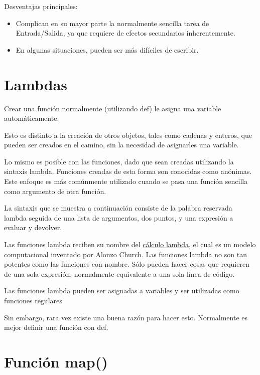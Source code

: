 \documentclass{report}
\begin{document}
Desventajas principales:

\begin{itemize}
  \item Complican en su mayor parte la normalmente sencilla tarea de Entrada/Salida, ya que requiere de efectos secundarios inherentemente.
  
  \item En algunas situaciones, pueden ser más difíciles de escribir.
\end{itemize}

\section{Lambdas}

Crear una función normalmente (utilizando def) le asigna una variable automáticamente.

Esto es distinto a la creación de otros objetos, tales como cadenas y enteros, que pueden ser creados en el camino, sin la necesidad de asignarles una variable.

Lo mismo es posible con las funciones, dado que sean creadas utilizando la sintaxis lambda. Funciones creadas de esta forma son conocidas como anónimas.
Este enfoque es más comúnmente utilizado cuando se pasa una función sencilla como argumento de otra función.

La sintaxis que se muestra a continuación consiste de la palabra reservada lambda seguida de una lista de argumentos, dos puntos, y una expresión a evaluar y devolver.


Las funciones lambda reciben su nombre del \href{https://es.wikipedia.org/wiki/C%C3%A1lculo_lambda}{cálculo lambda}, el cual es un modelo computacional inventado por Alonzo Church.
Las funciones lambda no son tan potentes como las funciones con nombre. Sólo pueden hacer cosas que requieren de una sola expresión, normalmente equivalente a una sola línea de código.


Las funciones lambda pueden ser asignadas a variables y ser utilizadas como funciones regulares.


Sin embargo, rara vez existe una buena razón para hacer esto. Normalmente es mejor definir una función con def.

\section{Función map()}
\end{document}
